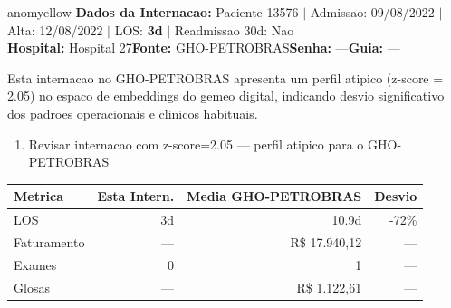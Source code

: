 \documentclass[a4paper,10pt]{article}
\begin{document}
\newpage

\begin{anomalycard}[Internacao 14624 | GHO-PETROBRAS | MODERADO (z=2.05)]{anomyellow}
\textbf{Dados da Internacao:} Paciente 13576 $\mid$ Admissao: 09/08/2022 $\mid$ Alta: 12/08/2022 $\mid$ LOS: \textbf{3d} $\mid$ Readmissao 30d: Nao\\
\textbf{Hospital:} Hospital 27\quad\textbf{Fonte:} GHO-PETROBRAS\quad\textbf{Senha:} ---\quad\textbf{Guia:} ---\\
\vspace{2pt}\begin{tcolorbox}[colback=severityred!20,colframe=anomyellow,title={\textbf{Interpretacao de Negocio}},fonttitle=\bfseries\small,left=4pt,right=4pt,top=3pt,bottom=3pt]
{\small Esta internacao no GHO-PETROBRAS apresenta um perfil atipico (z-score = 2.05) no espaco de embeddings do gemeo digital, indicando desvio significativo dos padroes operacionais e clinicos habituais.}
\end{tcolorbox}
\begin{tcolorbox}[colback=severityyellow!30,colframe=anomorange,title={\textbf{Recomendacoes Especificas}},fonttitle=\bfseries\small,left=4pt,right=4pt,top=3pt,bottom=3pt]
\begin{enumerate}[nosep,leftmargin=16pt]
\item {\small Revisar internacao com z-score=2.05 --- perfil atipico para o GHO-PETROBRAS}
\end{enumerate}
\end{tcolorbox}
\begin{center}\begin{tabular}{l r r r}\toprule\textbf{Metrica} & \textbf{Esta Intern.} & \textbf{Media GHO-PETROBRAS} & \textbf{Desvio} \\\midrule
LOS & 3d & 10.9d & -72\% \\
Faturamento & --- & R\$ 17.940,12 & --- \\
Exames & 0 & 1 & --- \\
Glosas & --- & R\$ 1.122,61 & --- \\
\bottomrule\end{tabular}\end{center}


\end{anomalycard}
\end{document}
